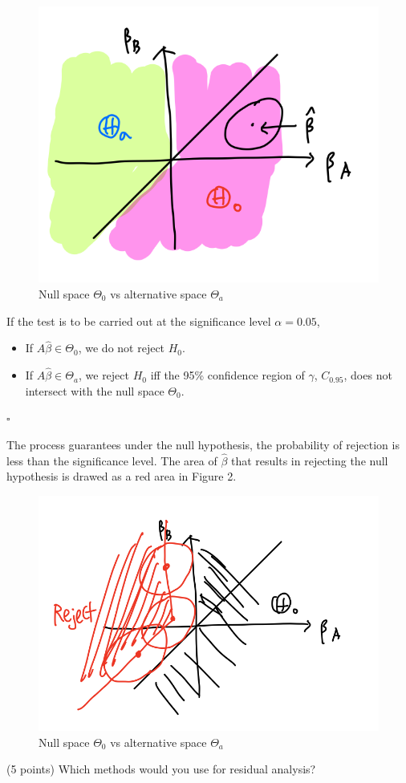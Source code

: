 \documentclass[11pt]{article}
\newcommand{\0}{{\mathbf{0}}}
\newcommand{\1}{{\mathbf{1}}}
\newcommand{\pr}[1]{\noindent{\bf #1.}}
\newcommand{\so}{\noindent{\textsc{Solution.\;\;}}}
\newcommand{\ed}{\hfill$\square$}
\begin{document}
\begin{figure}[h]
      \includegraphics[width=.5\textwidth]{figures/hypo.png}
      \centering
      \caption{Null space $\Theta_0$ vs alternative space $\Theta_a$}
      \label{fig:hypo}
\end{figure}

If the test is to be carried out at the significance level $\alpha = 0.05$,
\begin{itemize}
\item If $A\hat{\beta}\in \Theta_0$, we do not reject $H_0$.
\item If $A\hat{\beta}\in \Theta_a$, we reject $H_0$ iff the 95\% confidence region of $\gamma$, $C_{0.95}$, does not intersect with the null space $\Theta_0$.
\end{itemize}
\ed

The process guarantees under the null hypothesis, the probability of rejection is less than the significance level. The area of $\hat{\beta}$ that results in rejecting the null hypothesis is drawed as a red area in Figure 2.

\begin{figure}[h]
      \includegraphics[width=.5\textwidth]{figures/reject.png}
      \centering
      \caption{Null space $\Theta_0$ vs alternative space $\Theta_a$}
      \label{fig:reject}
\end{figure}


\pr{5} (5 points) Which methods would you use for residual analysis?

\so
\end{document}
